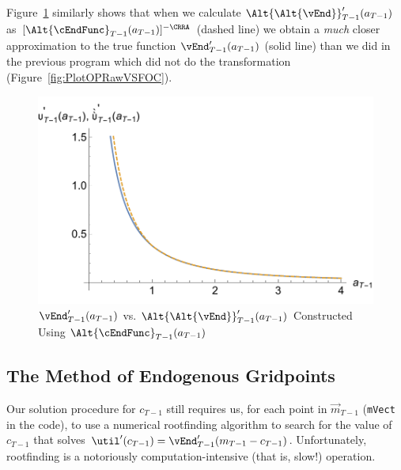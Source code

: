 \documentclass[titlepage]{\econtex}
\begin{document}
Figure~\ref{fig:GothVVSGothCInv} similarly shows that when we calculate
$\Alt{\Alt{\vEnd}}_{T-1}^{\prime}({a}_{T-1})$ as
$[\Alt{\cEndFunc}_{T-1}({a}_{T-1})]^{-\CRRA}$ (dashed line) we
obtain a \textit{much} closer approximation to the true function
$\vEnd_{T-1}^{\prime}({a}_{T-1})$ (solid line) than we did in
the previous  program which did not do the
transformation (Figure~\ref{fig:PlotOPRawVSFOC}).

\hypertarget{GothVVSGothCInv}{}
\begin{figure}
  \includegraphics{./Figures/GothVVSGothCInv}
  \caption{$\vEnd_{T-1}^{\prime}({a}_{T-1})$ vs. $\Alt{\Alt{\vEnd}}_{T-1}^{\prime}({a}_{T-1})$ Constructed Using $\Alt{\cEndFunc}_{T-1}({a}_{T-1})$}
  \label{fig:GothVVSGothCInv}
\end{figure}



\hypertarget{The-Method-of-Endogenous-Gridpoints}{}
\subsection{The Method of Endogenous Gridpoints}

Our solution procedure for ${c}_{T-1}$ still requires us, for each
point in $\vec{m}_{T-1}$ (\texttt{mVect} in the code), to use a
numerical rootfinding algorithm to search for the value of ${c}_{T-1}$
that solves $\util^{\prime}({c}_{T-1}) =
\vEnd_{T-1}^{\prime}({m}_{T-1}-{c}_{T-1})$.  Unfortunately, rootfinding
is a notoriously computation-intensive (that is, slow!) operation.
\end{document}
